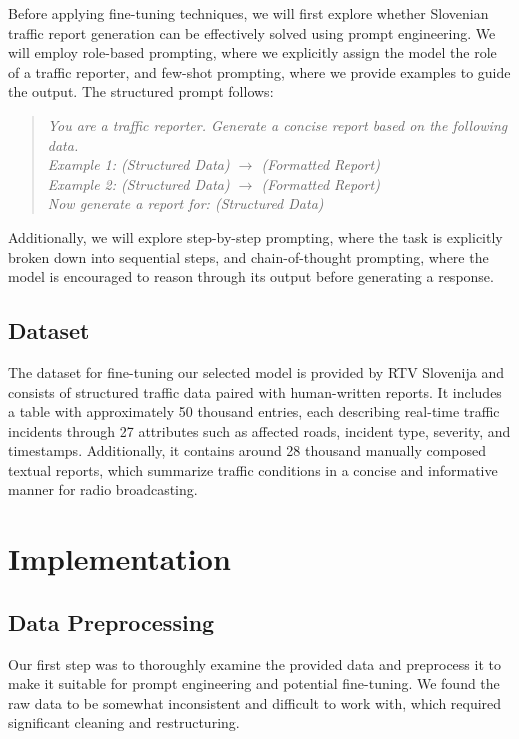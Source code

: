 \documentclass[fleqn,moreauthors,10pt]{ds_report}
\begin{document}
Before applying fine-tuning techniques, we will first explore whether Slovenian traffic report generation can be effectively solved using prompt engineering. We will employ role-based prompting, where we explicitly assign the model the role of a traffic reporter, and few-shot prompting, where we provide examples to guide the output. The structured prompt follows:

\begin{quote}
\textit{You are a traffic reporter. Generate a concise report based on the following data.} \\ 

\textit{Example 1: (Structured Data) $\rightarrow$ (Formatted Report)} \\
\textit{Example 2: (Structured Data) $\rightarrow$ (Formatted Report)} \\
\textit{Now generate a report for: (Structured Data)}
\end{quote}

Additionally, we will explore step-by-step prompting, where the task is explicitly broken down into sequential steps, and chain-of-thought prompting, where the model is encouraged to reason through its output before generating a response.

\subsection*{Dataset}

The dataset for fine-tuning our selected model is provided by RTV Slovenija and consists of structured traffic data paired with human-written reports. It includes a table with approximately 50 thousand entries, each describing real-time traffic incidents through 27 attributes such as affected roads, incident type, severity, and timestamps. Additionally, it contains around 28 thousand manually composed textual reports, which summarize traffic conditions in a concise and informative manner for radio broadcasting.

\section*{Implementation}

\subsection*{Data Preprocessing}
Our first step was to thoroughly examine the provided data and preprocess it to make it suitable for prompt engineering and potential fine-tuning. We found the raw data to be somewhat inconsistent and difficult to work with, which required significant cleaning and restructuring.
\end{document}
